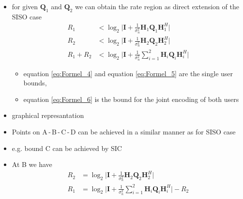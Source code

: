 \documentclass[a4paper, 10pt]{article}
\begin{document}
\begin{itemize}
\begin{itemize}
\begin{itemize}
		\end{itemize}
		\item for given $\mathbf{Q}_1 $ and $\mathbf{Q}_2 $ we can obtain the rate region as direct extension of the SISO case
		\begin{align}
			R_1 &< \log_2\bigl|\mathbf{I} + \frac{1}{\sigma_n^2}\mathbf{H}_1\mathbf{Q}_1\mathbf{H}_1^H\bigr|\label{eq:Formel_4}\\
			R_2 &< \log_2\bigl|\mathbf{I} + \frac{1}{\sigma_n^2}\mathbf{H}_2\mathbf{Q}_2\mathbf{H}_2^H\bigr|\label{eq:Formel_5}\\
			R_1 + R_2 &< \log_2\bigl|\mathbf{I} + \frac{1}{\sigma_n^2}\sum_{i = 1}^{2}\mathbf{H}_i\mathbf{Q}_i\mathbf{H}_i^H\bigr|\label{eq:Formel_6}			
		\end{align}
		\begin{itemize}
			\item equation \ref{eq:Formel_4} and equation  \ref{eq:Formel_5} are the single user bounds,
			\item equation \ref{eq:Formel_6} is the bound for the joint encoding of both users
		\end{itemize}
		\item graphical represantation\\
	\item Points on A\,-\,B\,-\,C\,-\,D can be achieved in a similar manner as for SISO case	
	\item e.g. bound C can be achieved by SIC
	\item At B we have 
	\begin{align*}
		R_2 &= \log_2\bigl|\mathbf{I} + \frac{1}{\sigma_n^2}\mathbf{H}_2\mathbf{Q}_2\mathbf{H}_2^H\bigr|\\
		R_1 &= \log_2\bigl|\mathbf{I} + \frac{1}{\sigma_n^2}\sum_{i = 1}^{2}\mathbf{H}_i\mathbf{Q}_i\mathbf{H}_i^H\bigr| - R_2\\

\end{align*}
\end{itemize}
\end{itemize}
\end{document}
